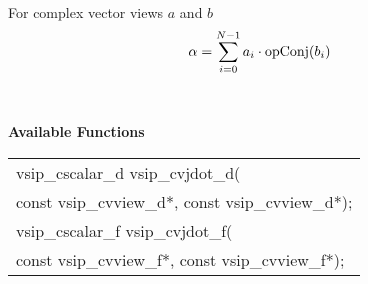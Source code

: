\\ \hspace*{.8cm}For complex vector views $a$ and $b$
\begin{equation*}
\alpha = \sum \limits_{i=0}^{N-1} a_i \cdot \operatorname{opConj}(b_i)
\end{equation*}
\\\cvsiplh
\\ \hspace*{.8cm} \vspace*{.1cm} \textbf{Available Functions }
\\ \hspace*{1.1cm} {
\ttfamily
\begin{tabular}[H]{l}
vsip\_cscalar\_d vsip\_cvjdot\_d(\\*\hspace{.6cm}const vsip\_cvview\_d*, const vsip\_cvview\_d*);\\
vsip\_cscalar\_f vsip\_cvjdot\_f(\\*\hspace{.6cm}const vsip\_cvview\_f*, const vsip\_cvview\_f*);\\
\end{tabular}
}
\\\pyjvsiph
{}
